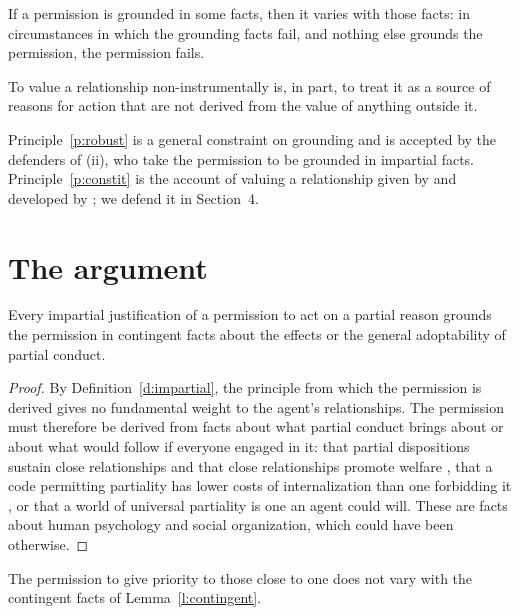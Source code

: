\documentclass{situationist-preprint}
\begin{document}
\begin{principle}\label{p:robust}
If a permission is grounded in some facts, then it varies with those facts: in circumstances in which the grounding facts fail, and nothing else grounds the permission, the permission fails.
\end{principle}

\begin{principle}[Constitution]\label{p:constit}
To value a relationship non-instrumentally is, in part, to treat it as a source of reasons for action that are not derived from the value of anything outside it.
\end{principle}

Principle~\ref{p:robust} is a general constraint on grounding and is accepted by the defenders of (ii), who take the permission to be grounded in impartial facts. Principle~\ref{p:constit} is the account of valuing a relationship given by \citet{Scheffler1997} and developed by \citet{Kolodny2003}; we defend it in Section~4.

\section{The argument}

\begin{lemma}\label{l:contingent}
Every impartial justification of a permission to act on a partial reason grounds the permission in contingent facts about the effects or the general adoptability of partial conduct.
\end{lemma}

\begin{proof}
By Definition~\ref{d:impartial}, the principle from which the permission is derived gives no fundamental weight to the agent's relationships. The permission must therefore be derived from facts about what partial conduct brings about or about what would follow if everyone engaged in it: that partial dispositions sustain close relationships and that close relationships promote welfare \citep{Railton1984}, that a code permitting partiality has lower costs of internalization than one forbidding it \citep{Hooker2000}, or that a world of universal partiality is one an agent could will. These are facts about human psychology and social organization, which could have been otherwise.
\end{proof}

\begin{lemma}\label{l:invariant}
The permission to give priority to those close to one does not vary with the contingent facts of Lemma~\ref{l:contingent}.
\end{lemma}
\end{document}
